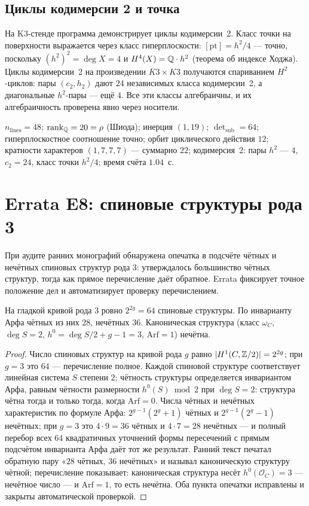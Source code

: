 \subsection{Циклы кодимерсии 2 и точка}

На K3-стенде программа демонстрирует циклы кодимерсии~2. Класс точки
на поверхности выражается через класс гиперплоскости:
$[\mathrm{pt}]=h^2/4$ — точно, поскольку $(h^2)^2=\deg X=4$ и
$H^4(X)=\mathbb{Q}\cdot h^2$ (теорема об индексе Ходжа). Циклы кодимерсии~2
на произведении $K3\times K3$ получаются спариванием $H^2$-циклов:
пары $(c_2, h_2)$ дают $24$ независимых класса кодимерсии~2, а
диагональные $h^2$-пары — ещё $4$. Все эти классы алгебраичны,
и их алгебраичность проверена явно через носители.

\begin{databox}
$n_{\mathrm{lines}}=48$; $\operatorname{rank}_{\mathbb{Q}}=20=\rho$ (Шиода);
инерция $(1,19)$; $\det_{\mathrm{sub}}=64$; гиперплоскостное
соотношение точно; орбит циклического действия $12$; кратности
характеров $(1,7,7,7)$ — суммарно $22$; кодимерсия~2: пары $h^2$ — $4$,
$c_2=24$, класс точки $h^2/4$; время счёта $1.04$~с.
\end{databox}

\section{Errata E8: спиновые структуры рода 3}\label{sec:e8}

При аудите ранних монографий обнаружена опечатка в подсчёте чётных
и нечётных спиновых структур рода $3$: утверждалось большинство чётных
структур, тогда как прямое перечисление даёт обратное. Errata фиксирует
точное положение дел и автоматизирует проверку перечислением.

\begin{theorem}[28/36]\label{th:e8}
На гладкой кривой рода $3$ ровно $2^{2g}=64$ спиновые структуры.
По инварианту Арфа чётных из них $28$, нечётных $36$. Каноническая
структура (класс $\omega_C$, $\deg S=2$, $h^0=\deg S/2+g-1=3$,
$\mathrm{Arf}=1$) нечётна.
\end{theorem}

\begin{proof}
Число спиновых структур на кривой рода $g$ равно $|H^1(C,\mathbb{Z}/2)|=2^{2g}$;
при $g=3$ это $64$ — перечисление полное. Каждой спиновой структуре
соответствует линейная система $S$ степени $2$; чётность структуры
определяется инвариантом Арфа, равным чётности размерности
$h^0(S)\bmod 2$ при $\deg S=2$: структура чётна тогда и только тогда,
когда $\mathrm{Arf}=0$. Числа чётных и нечётных характеристик по формуле Арфа:
$2^{g-1}(2^g+1)$ чётных и $2^{g-1}(2^g-1)$ нечётных; при $g=3$ это
$4\cdot9=36$ чётных и $4\cdot7=28$ нечётных — и полный перебор всех
$64$ квадратичных уточнений формы пересечений с прямым подсчётом
инварианта Арфа даёт тот же результат. Ранний текст печатал
обратную пару «$28$ чётных, $36$ нечётных» и называл каноническую
структуру чётной; перечисление показывает: каноническая структура
несёт $h^0(\mathcal O_C)=3$ — нечётное число — и $\mathrm{Arf}=1$,
то есть нечётна. Оба пункта опечатки исправлены и закрыты
автоматической проверкой.
\end{proof}

